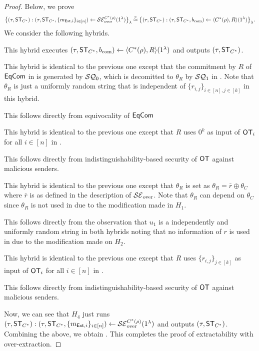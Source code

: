 \begin{proof}
Below, we prove 
\begin{equation} \label{eq:ind_SE_over}
\big\{ (\tau,\mathsf{ST}_{C^*}):(\tau,\mathsf{ST}_{C^*},\{m_{\mathsf{Ext},i}\}_{i\in[n]})\gets \mathcal{SE}_{\mathrm{over}}^{C^*(\rho)}(1^\lambda) \big\}_\lambda
\stackrel{\text{c}}{\approx}
\big\{(\tau, \mathsf{ST}_{C^*}):(\tau,\mathsf{ST}_{C^*},b_{\mathrm{com}}) \gets \langle C^*(\rho), R \rangle(1^\lambda)\big\}_\lambda.  
\end{equation}
We consider the following hybrids. 

 This hybrid executes  $(\tau,\mathsf{ST}_{C^*},b_{\mathrm{com}}) \gets \langle C^*(\rho), R \rangle(1^\lambda)$ and outputs $(\tau, \mathsf{ST}_{C^*})$. 

 This hybrid is identical to the previous one except that the commitment by $R$ of $\mathsf{EqCom}$ in  is generated by $\mathcal{SQ}_0$, which is decomitted to $\theta_R$ by $\mathcal{SQ}_1$ in . Note that $\theta_R$ is just a uniformly random string that is independent of $\{r_{i,j}\}_{i\in[n],j\in[k]}$ in this hybrid. 

 This follows directly from equivocality of $\mathsf{EqCom}$

 This hybrid is identical to the previous one except that $R$ uses $0^k$ as input of $\mathsf{OT}_i$ for all $i\in[n]$ in . 

 This follows directly from indistinguishability-based security of $\mathsf{OT}$ against malicious senders. 

 This hybrid is identical to the previous one except that 
$\theta_R$ is set as $\theta_R=\bar{r}\oplus \theta_C$ where $\bar{r}$ is as defined in the description of $\mathcal{SE}_{\mathrm{over}}$. Note that $\theta_R$ can depend on $\theta_C$ since $\theta_R$ is not used in    due to the modification made in $H_1$. 

 This follows directly from the observation that $u_1$ is a independently and uniformly random string in both hybrids noting that no information of $r$ is used in  due to the modification made on $H_2$. 

 This hybrid is identical to the previous one except that $R$ uses $\{r_{i,j}\}_{j\in[k]}$ as input of $\mathsf{OT}_i$ for all $i\in[n]$ in . 

 This follows directly from indistinguishability-based security of $\mathsf{OT}$ against malicious senders. 

Now, we can see that $H_4$ just runs  $(\tau,\mathsf{ST}_{C^*}):(\tau,\mathsf{ST}_{C^*},\{m_{\mathsf{Ext},i}\}_{i\in[n]})\gets \mathcal{SE}_{\mathrm{over}}^{C^*(\rho)}(1^\lambda)$  and outputs $(\tau, \mathsf{ST}_{C^*})$. 
Combining the above, we obtain 
. 
This completes the proof of extractability with over-extraction.
\end{proof}

